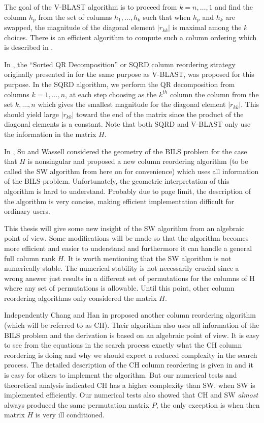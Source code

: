\documentclass[12pt,Bold,letterpaper]{mcgilletdclass}
\begin{document}
The goal of the V-BLAST algorithm is to proceed from $k=n, \dots,1$ and find the column $h_p$ from the set of columns $h_1, \dots, h_k$ such that when $h_p$ and $h_k$ are swapped, the magnitude of the diagonal element $|r_{kk}|$ is maximal among the $k$ choices. There is an efficient algorithm to compute such a column ordering which is described in \cite{ChaP07}.

In \cite{ChaH05}, the ``Sorted QR Decomposition'' or SQRD column reordering strategy originally presented in \cite{WubBRKK01} for the same purpose as V-BLAST, was proposed for this purpose. In the SQRD algorithm, we perform the QR decomposition from columns $k = 1,\dots, n$, at each step choosing as the $k^{th}$ column the column from the set $k,\dots,n$ which gives the smallest magnitude for the diagonal element $|r_{kk}|$. This should yield large $|r_{kk}|$ toward the end of the matrix since the product of the diagonal elements is a constant. Note that both SQRD and V-BLAST only use the information in the matrix $H$.

In \cite{SuW05}, Su and Wassell considered the geometry of the BILS
problem for the case that $H$ is nonsingular and proposed a new column reordering algorithm (to be called
the SW algorithm from here on for convenience) which uses all information of the BILS problem.
Unfortunately, the geometric interpretation of this algorithm is hard to understand.
Probably due to page limit, the description of the algorithm is very concise, 
making efficient implementation difficult for ordinary users.

This thesis will give some new insight of the SW algorithm from an algebraic point of view.
Some modifications will be made so that the algorithm becomes more efficient
and easier to understand and furthermore it can handle a general full column rank $H$.
It is worth mentioning that the SW algorithm is not numerically stable. The numerical stability is not
necessarily crucial since a wrong answer just results in a different set of
permutations for the columns of H where any set of permutations is allowable.
Until this point, other column reordering algorithms only considered the matrix $H$.

Independently  Chang and Han in \cite{ChaH05} proposed
another column reordering algorithm (which will be referred to as  CH).
Their algorithm also uses all information of the BILS problem and the derivation
is based on an algebraic point of view. It is  easy to see from the equations in
the search process exactly what the CH column reordering is doing and why we
should expect a reduced complexity in the search process. The detailed
description of the CH column reordering is given in \cite{ChaH05} and it is easy
for others to implement the algorithm.
But our numerical tests and theoretical analysis indicated CH has a higher complexity than SW, when SW
is implemented efficiently.
Our numerical tests also showed that CH and SW {\em almost} always   
produced the same permutation matrix $P$, the only exception is when then matrix $H$ is very ill conditioned.
\end{document}
